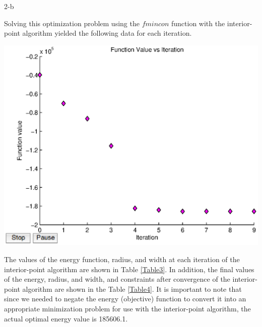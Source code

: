\documentclass[11pt]{article}
\begin{document}
\begin{problem}{2-b}
\end{problem}
\begin{solution}
Solving this optimization problem using the $fmincon$ function with the interior-point algorithm yielded the following data for each iteration.

\begin{center}
\includegraphics[scale=0.75]{problem2/problem2.eps}
\end{center}

The values of the energy function, radius, and width at each iteration of the interior-point algorithm are shown in Table \ref{Table3}. In addition, the final values of the energy, radius, and width, and constraints after convergence of the interior-point algorithm are shown in the Table \ref{Table4}. It is important to note that since we needed to negate the energy (objective) function to convert it into an appropriate minimization problem for use with the interior-point algorithm, the actual optimal energy value is 185606.1.


\end{solution}
\end{document}
